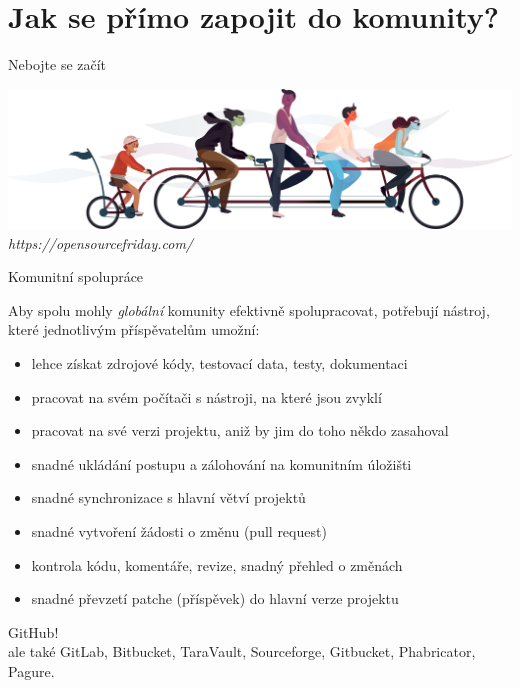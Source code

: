 \documentclass[11pt]{beamer}
\begin{document}
\section{Jak se přímo zapojit do komunity?}

\begin{frame}{Nebojte se začít}
	\begin{center}
		\includegraphics[width=\textwidth]{images/multikolo.png} 
		\textit{{\tiny https://opensourcefriday.com/}}
	\end{center}
\end{frame}


\begin{frame}{Komunitní spolupráce}
	
	Aby spolu mohly \textit{globální} komunity efektivně spolupracovat, potřebují nástroj, které jednotlivým příspěvatelům umožní:
	
	\begin{itemize}
		\item lehce získat zdrojové kódy, testovací data, testy, dokumentaci
		\item pracovat na svém počítači s nástroji, na které jsou zvyklí
		\item pracovat na své verzi projektu, aniž by jim do toho někdo zasahoval
		\item snadné ukládání postupu a zálohování na komunitním úložišti
		\item snadné synchronizace s hlavní větví projektů
		\item snadné vytvoření žádosti o změnu (pull request)
		\item kontrola kódu, komentáře, revize, snadný přehled o změnách
		\item snadné převzetí patche (příspěvek) do hlavní verze projektu
	\end{itemize}
\end{frame}

\begin{frame}
	\begin{center}
		{\Huge GitHub!} \\
		\vspace{2cm}
		ale také GitLab, Bitbucket, TaraVault, Sourceforge, Gitbucket, Phabricator, Pagure.
		
	\end{center}
\end{frame}
\end{document}
